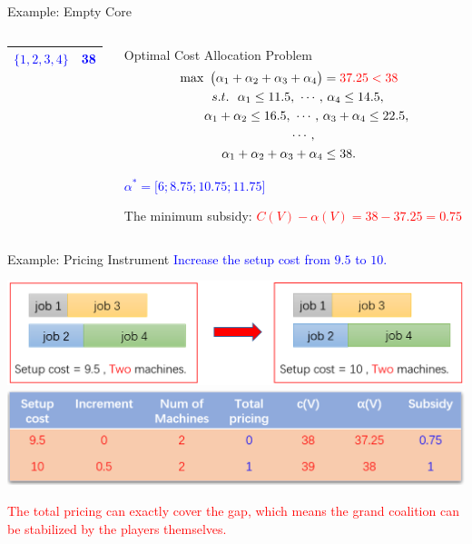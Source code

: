\documentclass[14pt]{beamer}
\begin{document}
\begin{frame}{Example: Empty Core}
\begin{columns}
\begin{column}{4.5cm}
\begin{table}[H]
\begin{tabular}[!h]{c c }
\textcolor{blue}{$\{1,2,3,4\}$}	&\textcolor{blue}{38}	\\
\hline
\end{tabular}
\end{table}
\end{column}
\pause
\begin{column}{6.5cm}
\footnotesize
\vspace{-1.5em}
\begin{shaded}
\centering
Optimal Cost Allocation Problem
\begin{eqnarray*}
\begin{aligned}
\max ~\big(\alpha_1 + \alpha_2 + \alpha_3 + \alpha_4\big) &= \textcolor{red}{37.25 < 38}\\
s.t.~~ \alpha_1 \leq 11.5,~\cdots,&~\alpha_4 \leq 14.5,\\
\alpha_1 + \alpha_2 \leq 16.5,~\cdots,~ &\alpha_3+\alpha_4 \leq 22.5,\\
~~~~~~~~~~\cdots,~~&\\
\alpha_1 + \alpha_2 + \alpha_3 + \alpha_4 &\leq 38.
\end{aligned}
\end{eqnarray*}
\vspace{-0.5em}
\end{shaded}
\begin{shaded}
\centering
\textcolor{blue}{
$\alpha^* = \big[6;8.75;10.75;11.75\big]$}
\end{shaded}
\begin{shaded}
\centering
The minimum subsidy:
\textcolor{red}{
$C(V)-\alpha(V) = 38-37.25 = 0.75$}
\end{shaded}
\end{column}
\end{columns}
\end{frame}

\begin{frame}{Example: Pricing Instrument}
\small
\centering
\textcolor{blue}{Increase the setup cost from $9.5$ to $10$.}
\vspace{2mm}

\centering
\includegraphics[width = 1\textwidth]{Figures/m2.png}
\pause
\centering
\includegraphics[width = 1\textwidth]{Figures/m3.png}

\textcolor{red}{The total pricing can exactly cover the gap, which means the grand coalition can be stabilized by the players themselves.}
\end{frame}
\end{document}

